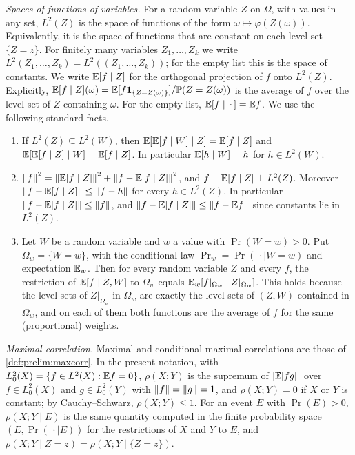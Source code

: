 \emph{Spaces of functions of variables.} For a random variable $Z$ on
$\Omega$, with values in any set, $L^2(Z)$ is the space of functions of the
form $\omega\mapsto\varphi(Z(\omega))$. Equivalently, it is the space of
functions that are constant on each level set $\{Z=z\}$. For finitely many
variables $Z_1,\dots,Z_k$ we write $L^2(Z_1,\dots,Z_k)=L^2((Z_1,\dots,Z_k))$;
for the empty list this is the space of constants. We write $\mathbb E[f\mid Z]$ for
the orthogonal projection of $f$ onto $L^2(Z)$. Explicitly,
$\mathbb E[f\mid Z](\omega)=\mathbb E[f\mathbf 1_{\{Z=Z(\omega)\}}]/\mathbb P(Z=Z(\omega))$ is the
average of $f$ over the level set of $Z$ containing $\omega$. For the empty
list, $\mathbb E[f\mid\,\cdot\,]=\mathbb E f$. We use the following standard facts.
\begin{enumerate}[label=(P\arabic*)]
\item\label{P:tower} If $L^2(Z)\subseteq L^2(W)$, then
  $\mathbb E[\mathbb E[f\mid W]\mid Z]=\mathbb E[f\mid Z]$ and
  $\mathbb E[\mathbb E[f\mid Z]\mid W]=\mathbb E[f\mid Z]$. In particular $\mathbb E[h\mid W]=h$ for
  $h\in L^2(W)$.
\item\label{P:pyth} $\left\|f\right\|^2=\left\|\mathbb E[f\mid Z]\right\|^2+\left\|f-\mathbb E[f\mid Z]\right\|^2$,
  and $f-\mathbb E[f\mid Z]\perp L^2(Z)$. Moreover
  $\left\|f-\mathbb E[f\mid Z]\right\|\le\left\|f-h\right\|$ for every $h\in L^2(Z)$. In particular
  $\left\|f-\mathbb E[f\mid Z]\right\|\le\left\|f\right\|$, and
  $\left\|f-\mathbb E[f\mid Z]\right\|\le\left\|f-\mathbb E f\right\|$ since constants lie in $L^2(Z)$.
\item\label{P:restrict} Let $W$ be a random variable and $w$ a value with
  $\Pr(W=w)>0$. Put $\Omega_w=\{W=w\}$, with the conditional law
  $\Pr_w=\Pr(\,\cdot\mid W=w)$ and expectation $\mathbb E_w$. Then for every random
  variable $Z$ and every $f$, the restriction of $\mathbb E[f\mid Z,W]$ to
  $\Omega_w$ equals $\mathbb E_w[f|_{\Omega_w}\mid Z|_{\Omega_w}]$. This holds
  because the level sets of $Z|_{\Omega_w}$ in $\Omega_w$ are exactly the
  level sets of $(Z,W)$ contained in $\Omega_w$, and on each of them both
  functions are the average of $f$ for the same (proportional) weights.
\end{enumerate}

\emph{Maximal correlation.} Maximal and conditional maximal correlations are
those of \cref{def:prelim:maxcorr}. In the present notation, with
$L^2_0(X)=\{f\in L^2(X):\mathbb E f=0\}$, $\rho(X;Y)$ is the supremum of
$|\mathbb E[fg]|$ over $f\in L^2_0(X)$ and $g\in L^2_0(Y)$ with
$\left\|f\right\|=\left\|g\right\|=1$, and $\rho(X;Y)=0$ if $X$ or $Y$ is constant; by
Cauchy--Schwarz, $\rho(X;Y)\le1$. For an event $E$ with $\Pr(E)>0$,
$\rho(X;Y\mid E)$ is the same quantity computed in the finite probability
space $(E,\Pr(\,\cdot\mid E))$ for the restrictions of $X$ and $Y$ to $E$,
and $\rho(X;Y\mid Z=z)=\rho(X;Y\mid\{Z=z\})$.

